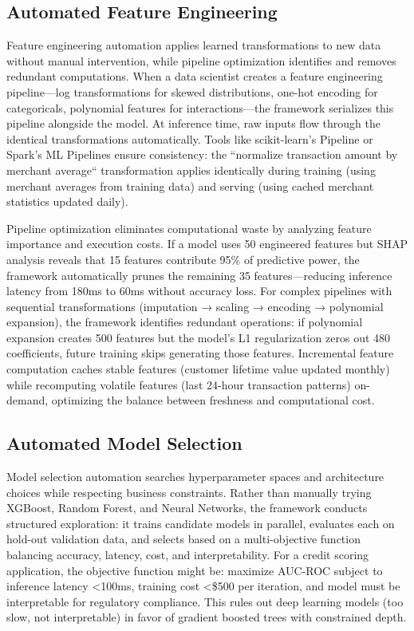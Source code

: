 \subsection{Automated Feature Engineering}

Feature engineering automation applies learned transformations to new data without manual intervention, while pipeline optimization identifies and removes redundant computations. When a data scientist creates a feature engineering pipeline---log transformations for skewed distributions, one-hot encoding for categoricals, polynomial features for interactions---the framework serializes this pipeline alongside the model. At inference time, raw inputs flow through the identical transformations automatically. Tools like scikit-learn's Pipeline or Spark's ML Pipelines ensure consistency: the ``normalize transaction amount by merchant average`` transformation applies identically during training (using merchant averages from training data) and serving (using cached merchant statistics updated daily).

Pipeline optimization eliminates computational waste by analyzing feature importance and execution costs. If a model uses 50 engineered features but SHAP analysis reveals that 15 features contribute 95\% of predictive power, the framework automatically prunes the remaining 35 features---reducing inference latency from 180ms to 60ms without accuracy loss. For complex pipelines with sequential transformations (imputation → scaling → encoding → polynomial expansion), the framework identifies redundant operations: if polynomial expansion creates 500 features but the model's L1 regularization zeros out 480 coefficients, future training skips generating those features. Incremental feature computation caches stable features (customer lifetime value updated monthly) while recomputing volatile features (last 24-hour transaction patterns) on-demand, optimizing the balance between freshness and computational cost.

\subsection{Automated Model Selection}

Model selection automation searches hyperparameter spaces and architecture choices while respecting business constraints. Rather than manually trying XGBoost, Random Forest, and Neural Networks, the framework conducts structured exploration: it trains candidate models in parallel, evaluates each on hold-out validation data, and selects based on a multi-objective function balancing accuracy, latency, cost, and interpretability. For a credit scoring application, the objective function might be: maximize AUC-ROC subject to inference latency <100ms, training cost <\$500 per iteration, and model must be interpretable for regulatory compliance. This rules out deep learning models (too slow, not interpretable) in favor of gradient boosted trees with constrained depth.

